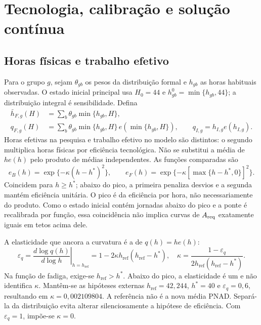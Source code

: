 \FloatBarrier
\section{Tecnologia, calibração e solução contínua}\label{app:calibration_details}\label{app:derivations}
\subsection{Horas físicas e trabalho efetivo}\label{app:kappa_deriv}
Para o grupo $g$, sejam $\theta_{gb}$ os pesos da distribuição formal e $h_{gb}$ as horas habituais observadas. O estado inicial principal usa $H_0=44$ e $h_{gb}^0=\min\{h_{gb},44\}$; a distribuição integral é sensibilidade. Defina
\begin{align}
\bar h_{F,g}(H)&=\sum_b\theta_{gb}\min\{h_{gb},H\},\\
q_{F,g}(H)&=\sum_b\theta_{gb}\min\{h_{gb},H\}\,e\!\left(\min\{h_{gb},H\}\right),\qquad q_{I,g}=h_{I,g}e(h_{I,g}).\label{eq:app_effective_hours}
\end{align}
Horas efetivas na pesquisa e trabalho efetivo no modelo são distintos: o segundo multiplica horas físicas por eficiência tecnológica. Não se substitui a média de $he(h)$ pelo produto de médias independentes. As funções comparadas são
\begin{equation}\label{eq:app_efficiency}
e_B(h)=\exp\{-\kappa(h-h^*)^2\},\qquad e_F(h)=\exp\{-\kappa[\max\{h-h^*,0\}]^2\}.
\end{equation}
Coincidem para $h\geq h^*$; abaixo do pico, a primeira penaliza desvios e a segunda mantém eficiência unitária. O pico é da eficiência por hora, não necessariamente do produto. Como o estado inicial contém jornadas abaixo do pico e a ponte é recalibrada por função, essa coincidência não implica curvas de $A_{\mathrm{req}}$ exatamente iguais em tetos acima dele.

A elasticidade que ancora a curvatura é a de $q(h)=he(h)$:
\begin{equation}\label{eq:kappa_derivation}
\varepsilon_q=\left.\frac{d\log q(h)}{d\log h}\right|_{h=h_{\mathrm{ref}}}=1-2\kappa h_{\mathrm{ref}}(h_{\mathrm{ref}}-h^*),\quad
\kappa=\frac{1-\varepsilon_q}{2h_{\mathrm{ref}}(h_{\mathrm{ref}}-h^*)}.
\end{equation}
Na função de fadiga, exige-se $h_{\mathrm{ref}}>h^*$. Abaixo do pico, a elasticidade é um e não identifica $\kappa$. Mantêm-se as hipóteses externas $h_{\mathrm{ref}}=42{,}244$, $h^*=40$ e $\varepsilon_q=0{,}6$, resultando em $\kappa=0{,}002109804$. A referência não é a nova média PNAD. Separá-la da distribuição evita alterar silenciosamente a hipótese de eficiência. Com $\varepsilon_q=1$, impõe-se $\kappa=0$.

